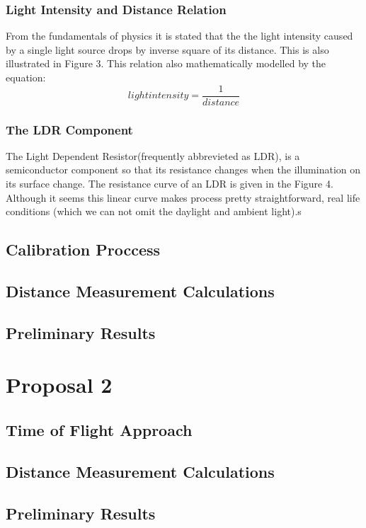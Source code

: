 \documentclass[letterpaper,12pt]{article}
\begin{document}
\subsubsection{Light Intensity and Distance Relation}
From the fundamentals of physics it is stated that the the light intensity caused by a single light source drops by inverse square of its distance. This is also illustrated in Figure 3.
This relation also mathematically modelled by the equation:
\[light intensity  = \frac{1}{distance}\]
\subsubsection{The LDR Component}
The Light Dependent Resistor(frequently abbrevieted as LDR), is a semiconductor component so that its  resistance changes when the illumination on its surface change. The resistance curve of an LDR is given in the Figure 4.
Although it seems this linear curve makes process pretty straightforward, real life conditions  (which we can not omit the daylight and ambient light).s
\subsection{Calibration Proccess}
\subsection{Distance Measurement Calculations}
\subsection{Preliminary Results}

\section{Proposal 2}
\subsection{Time of Flight Approach}
\subsection{Distance Measurement Calculations}
\subsection{Preliminary Results}
\end{document}
